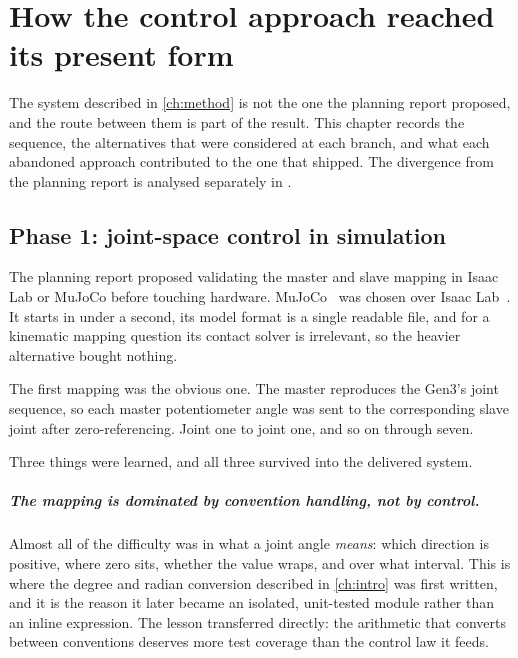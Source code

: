 \chapter{How the control approach reached its present form}
\label{ch:development}

The system described in \cref{ch:method} is not the one the planning report
proposed, and the route between them is part of the result. This chapter
records the sequence, the alternatives that were considered at each branch,
and what each abandoned approach contributed to the one that shipped. The
divergence from the planning report is analysed separately in
.


\section{Phase 1: joint-space control in simulation}

The planning report proposed validating the master and slave mapping in Isaac
Lab or MuJoCo before touching hardware. MuJoCo~\cite{todorov2012mujoco} was chosen over Isaac
Lab~\cite{isaaclab}. It starts in under a second, its model format
is a single readable file, and for a kinematic mapping question its contact
solver is irrelevant, so the heavier alternative bought nothing.

The first mapping was the obvious one. The master reproduces the Gen3's joint
sequence, so each master potentiometer angle was sent to the corresponding
slave joint after zero-referencing. Joint one to joint one, and so on through
seven.

Three things were learned, and all three survived into the delivered system.

\paragraph{The mapping is dominated by convention handling, not by control.}
Almost all of the difficulty was in what a joint angle \emph{means}: which
direction is positive, where zero sits, whether the value wraps, and over what
interval. This is where the degree and radian conversion described in
\cref{ch:intro} was first written, and it is the reason it later became an
isolated, unit-tested module rather than an inline expression. The lesson
transferred directly: the arithmetic that converts between conventions
deserves more test coverage than the control law it feeds.

